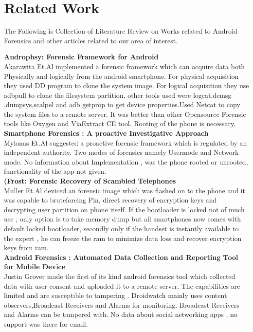 \chapter{Related Work}
\label{chap:lit_review}
The Following is Collection of Literature Review on Works related to Android Forensics and other articles related to our area of interest.\\
\bigskip 

\textbf{Androphsy: Forensic Framework for Android }\\
Akarawita Et.Al \cite{akarawita_2015} implemented a forensic framework which can acquire data both 
Physically and logically from the android smartphone. For physical acquisition they 
used DD program to clone the system image. For logical acquisition they use adbpull 
to clone the filesystem partition, other tools used were logcat,demsg ,dumpsys,scalpel 
and adb getprop to get device properties.Used Netcat to copy the system files to a 
remote server. It was better than other Opensource Forensic tools like Oxygen and 
ViaExtract CE tool. Rooting of the phone is necessary.\\

\textbf{Smartphone Forensics : A proactive Investigative Approach}\\
Mylonas Et.Al  suggested a proactive forensic framework which is regulated by an 
independent authority. Two modes of forensics namely Usermode and Network 
mode. No information about Implementation , was the phone rooted or unrooted, 
functionality of the app not given.\\ 

\textbf{(Frost: Forensic Recovery of Scambled Telephones}\\
Muller Et.Al\cite{muller2013frost} deviced an forensic image which was flashed on to the phone and it was 
capable to bruteforcing Pin, direct recovery of encryption keys and decrypting user 
partition on phone itself. If the bootloader is locked not of much use , only option is 
to take memory dump but all smartphones now comes with default locked bootloader, secondly only if the handset is instantly available to the expert , he can freeze the ram to minimize 
data loss and recover encryption keys from ram.\\

\textbf{Android Forensics : Automated Data Collection and Reporting Tool for Mobile Device }\\
Justin Grover \cite{Grovera2013} made the first of its kind android forensics tool which collected data with user consent and uploaded it to a remote server. The capabilities are limited and are susceptible to tampering . Droidwatch mainly uses content observers,Broadcast Receivers and Alarms for monitoring. Broadcast Receivers and Alarms can be tampered with. No data about social networking apps , no support was there for email. \\


